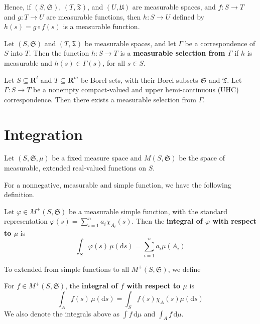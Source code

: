 Hence, if $(S, \mathfrak{S})$, $(T, \mathfrak{T})$, and $(U, \mathfrak{U})$ are measurable spaces, and $f : S \longrightarrow T$ and $g : T \longrightarrow U$ are measurable functions, then $h : S \longrightarrow U$ defined by $h(s) = g \circ f(s)$ is a measurable function.

\begin{definition}
	Let $(S, \mathfrak{S})$ and $(T, \mathfrak{T})$ be measurable spaces, and let $\Gamma$ be a correspondence of $S$ into $T$. Then the function $h : S \longrightarrow T$ is a \textbf{measurable selection from $\Gamma$} if $h$ is measurable and $h(s) \in \Gamma(s)$, for all $s \in S$.
\end{definition}

\begin{theorem}
	Let $S \subseteq \textbf{R}^l$ and $T \subseteq \textbf{R}^m$ be Borel sets, with their Borel subsets $\mathfrak{S}$ and $\mathfrak{T}$. Let $\Gamma : S \longrightarrow T$ be a nonempty compact-valued and upper hemi-continuous (UHC) correspondence. Then there exists a measurable selection from $\Gamma$.
\end{theorem}

\section{Integration}

Let $(S, \mathfrak{S}, \mu)$ be a fixed measure space and $M(S, \mathfrak{S})$ be the space of measurable, extended real-valued functions on $S$. 

For a nonnegative, measurable and simple function, we have the following definition.

\begin{definition}
	Let $\varphi \in M^+(S, \mathfrak{S})$ be a measurable simple function, with the standard representation $\varphi(s) = \sum_{i=1}^n a_i \chi_{A_i}(s)$. Then the \textbf{integral of $\varphi$ with respect to $\mu$} is 
	\[
		\int_S \varphi(s) \, \mu(\mathrm{d} s) = \sum_{i=1}^n a_i \mu(A_i)
	\]
\end{definition}

To extended from simple functions to all $M^+(S, \mathfrak{S})$, we define

\begin{definition}
	For $f \in M^+(S, \mathfrak{S})$, the \textbf{integral of $f$ with respect to $\mu$} is 
	\[
		\int_A f(s) \, \mu(\mathrm{d}s) = \int_S f(s) \chi_A (s) \mu(\mathrm{d}s)
	\]
	We also denote the integrals above as $\int f \, \mathrm{d} \mu$ and $\int_A f \, \mathrm{d} \mu$. 
\end{definition}

